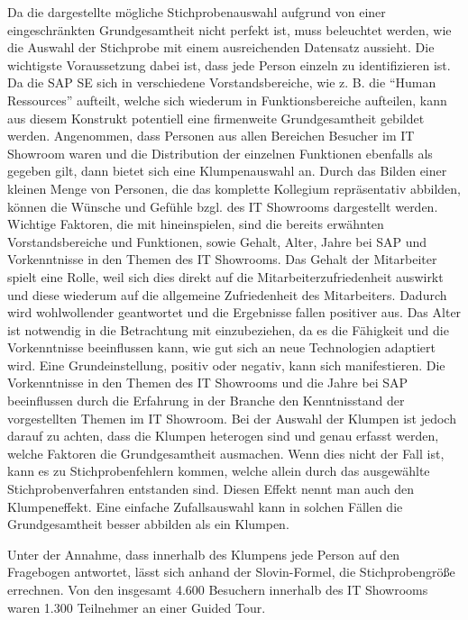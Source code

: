 Da die dargestellte mögliche Stichprobenauswahl aufgrund von einer eingeschränkten Grundgesamtheit nicht perfekt ist, muss beleuchtet werden, wie die Auswahl der Stichprobe mit einem ausreichenden Datensatz aussieht.
Die wichtigste Voraussetzung dabei ist, dass jede Person einzeln zu identifizieren ist.
Da die SAP SE sich in verschiedene Vorstandsbereiche, wie z. B. die \enquote{Human Ressources} aufteilt, welche sich wiederum in Funktionsbereiche aufteilen, kann aus diesem Konstrukt potentiell eine firmenweite Grundgesamtheit gebildet werden.
Angenommen, dass Personen aus allen Bereichen Besucher im IT Showroom waren und die Distribution der einzelnen Funktionen ebenfalls als gegeben gilt, dann bietet sich eine Klumpenauswahl an\autocite{Stichprobe}. %
Durch das Bilden einer kleinen Menge von Personen, die das komplette Kollegium repräsentativ abbilden, können die Wünsche und Gefühle bzgl. des IT Showrooms dargestellt werden.
Wichtige Faktoren, die mit hineinspielen, sind die bereits erwähnten Vorstandsbereiche und Funktionen, sowie Gehalt, Alter, Jahre bei SAP und Vorkenntnisse in den Themen des IT Showrooms.
Das Gehalt der Mitarbeiter spielt eine Rolle, weil sich dies direkt auf die Mitarbeiterzufriedenheit auswirkt und diese wiederum auf die allgemeine Zufriedenheit des Mitarbeiters.
Dadurch wird wohlwollender geantwortet und die Ergebnisse fallen positiver aus\autocite{Winter}.
Das Alter ist notwendig in die Betrachtung mit einzubeziehen, da es die Fähigkeit und die Vorkenntnisse beeinflussen kann, wie gut sich an neue Technologien adaptiert wird\autocite{prensky2001digital}. Eine Grundeinstellung, positiv oder negativ, kann sich manifestieren.
Die Vorkenntnisse in den Themen des IT Showrooms und die Jahre bei SAP beeinflussen durch die Erfahrung in der Branche den Kenntnisstand der vorgestellten Themen im IT Showroom.
Bei der Auswahl der Klumpen ist jedoch darauf zu achten, dass die Klumpen heterogen sind und genau erfasst werden, welche Faktoren die Grundgesamtheit ausmachen. 
Wenn dies nicht der Fall ist, kann es zu Stichprobenfehlern kommen, welche allein durch das ausgewählte Stichprobenverfahren entstanden sind.
Diesen Effekt nennt man auch den Klumpeneffekt.
Eine einfache Zufallsauswahl kann in solchen Fällen die Grundgesamtheit besser abbilden als ein Klumpen.

Unter der Annahme, dass innerhalb des Klumpens jede Person auf den Fragebogen antwortet, lässt sich anhand der Slovin-Formel, die Stichprobengröße errechnen. Von den insgesamt 4.600 Besuchern innerhalb des IT Showrooms waren 1.300 Teilnehmer an einer Guided Tour. 

